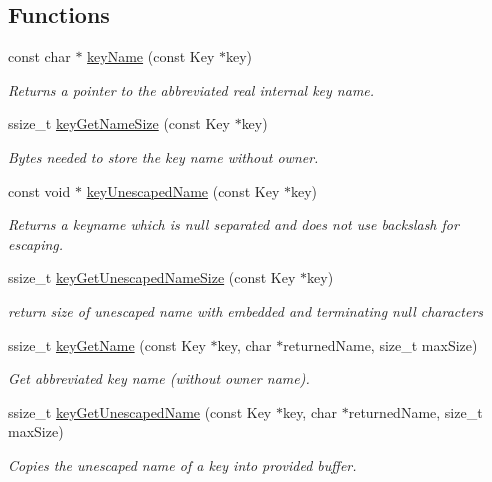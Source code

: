 \subsection*{Functions}
\begin{DoxyCompactItemize}
\item 
const char $\ast$ \hyperlink{group__keyname_ga8e805c726a60da921d3736cda7813513}{key\+Name} (const Key $\ast$key)
\begin{DoxyCompactList}\small\item\em Returns a pointer to the abbreviated real internal {\ttfamily key} name. \end{DoxyCompactList}\item 
ssize\+\_\+t \hyperlink{group__keyname_gabdbcfa51ed8a387e47ead207affa2d2e}{key\+Get\+Name\+Size} (const Key $\ast$key)
\begin{DoxyCompactList}\small\item\em Bytes needed to store the key name without owner. \end{DoxyCompactList}\item 
const void $\ast$ \hyperlink{group__keyname_ga6fe6af4c27b35d911a533f4ae4d698bb}{key\+Unescaped\+Name} (const Key $\ast$key)
\begin{DoxyCompactList}\small\item\em Returns a keyname which is null separated and does not use backslash for escaping. \end{DoxyCompactList}\item 
ssize\+\_\+t \hyperlink{group__keyname_ga5e7eff0c77678420199d0d2e8729152b}{key\+Get\+Unescaped\+Name\+Size} (const Key $\ast$key)
\begin{DoxyCompactList}\small\item\em return size of unescaped name with embedded and terminating null characters \end{DoxyCompactList}\item 
ssize\+\_\+t \hyperlink{group__keyname_gab29a850168d9b31c9529e90cf9ab68be}{key\+Get\+Name} (const Key $\ast$key, char $\ast$returned\+Name, size\+\_\+t max\+Size)
\begin{DoxyCompactList}\small\item\em Get abbreviated key name (without owner name). \end{DoxyCompactList}\item 
ssize\+\_\+t \hyperlink{group__keyname_ga44a576c7919d5b03f28d3ed3afaa7cd1}{key\+Get\+Unescaped\+Name} (const Key $\ast$key, char $\ast$returned\+Name, size\+\_\+t max\+Size)
\begin{DoxyCompactList}\small\item\em Copies the unescaped name of a key into provided buffer. \end{DoxyCompactList}\item 

\end{DoxyCompactItemize}
